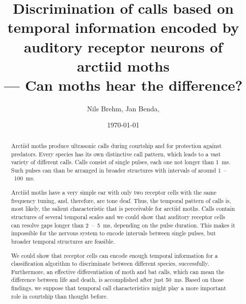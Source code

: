 \documentclass[12pt,a4paper]{article}
\title{Discrimination of calls based on temporal information encoded by auditory receptor neurons of arctiid moths\\--- Can moths hear the difference?}
\author{Nils Brehm, Jan Benda, \notejb{who else?}}
\date{\today} %
\begin{document}
\maketitle
		


\begin{abstract}
Arctiid moths produce ultrasonic calls during courtship and for protection against predators. Every species has its own distinctive call pattern, which leads to a vast variety of different calls. Calls consist of single pulses, each one not longer than 1~ms. Such pulses can than be arranged in broader structures with intervals of around 1~--~100~ms.

Arctiid moths have a very simple ear with only two receptor cells with the same frequency tuning, and, therefore, are tone deaf. Thus, the temporal pattern of calls is, most likely, the salient characteristic that is perceivable for arctiid moths. Calls contain structures of several temporal scales and we could show that auditory receptor cells can resolve gaps longer than 2~--~5~ms, depending on the pulse duration. This makes it impossible for the nervous system to encode intervals between single pulses, but broader temporal structures are feasible. 

We could show that receptor cells can encode enough temporal information for a classification algorithm to discriminate between different species, successfully. Furthermore, an effective differentiation of moth and bat calls, which can mean the difference between life and death, is accomplished after just 50~ms. Based on those findings, we suppose that temporal call characteristics might play a more important role in courtship than thought before.   
\end{abstract}
\end{document}
